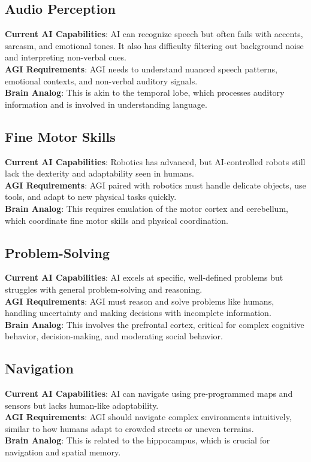 \documentclass[a4paper,10.5pt]{article}
\begin{document}
\subsection{Audio Perception}
\textbf{Current AI Capabilities}: AI can recognize speech but often fails with accents, sarcasm, and emotional tones. It also has difficulty filtering out background noise and interpreting non-verbal cues. \\
\textbf{AGI Requirements}: AGI needs to understand nuanced speech patterns, emotional contexts, and non-verbal auditory signals. \\
\textbf{Brain Analog}: This is akin to the temporal lobe, which processes auditory information and is involved in understanding language.

\subsection{Fine Motor Skills}
\textbf{Current AI Capabilities}: Robotics has advanced, but AI-controlled robots still lack the dexterity and adaptability seen in humans. \\
\textbf{AGI Requirements}: AGI paired with robotics must handle delicate objects, use tools, and adapt to new physical tasks quickly. \\
\textbf{Brain Analog}: This requires emulation of the motor cortex and cerebellum, which coordinate fine motor skills and physical coordination.

\subsection{Problem-Solving}
\textbf{Current AI Capabilities}: AI excels at specific, well-defined problems but struggles with general problem-solving and reasoning. \\
\textbf{AGI Requirements}: AGI must reason and solve problems like humans, handling uncertainty and making decisions with incomplete information. \\
\textbf{Brain Analog}: This involves the prefrontal cortex, critical for complex cognitive behavior, decision-making, and moderating social behavior.

\subsection{Navigation}
\textbf{Current AI Capabilities}: AI can navigate using pre-programmed maps and sensors but lacks human-like adaptability. \\
\textbf{AGI Requirements}: AGI should navigate complex environments intuitively, similar to how humans adapt to crowded streets or uneven terrains. \\
\textbf{Brain Analog}: This is related to the hippocampus, which is crucial for navigation and spatial memory.
\end{document}

